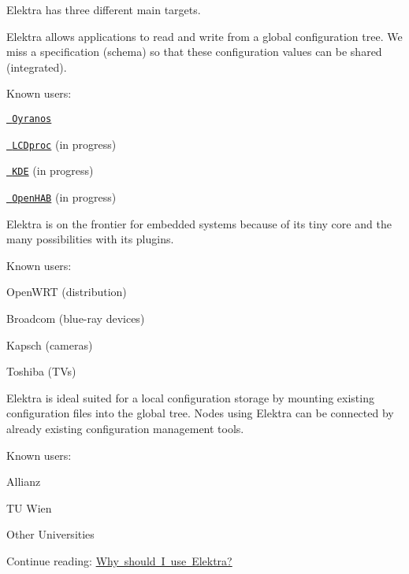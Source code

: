 Elektra has three different main targets.

Elektra allows applications to read and write from a global configuration tree. We miss a specification (schema) so that these configuration values can be shared (integrated).

Known users\+:


\begin{DoxyItemize}
\item \href{https://oyranos.org}{\texttt{ Oyranos}}
\item \href{http://lcdproc.omnipotent.net/}{\texttt{ L\+C\+Dproc}} (in progress)
\item \href{https://kde.org}{\texttt{ K\+DE}} (in progress)
\item \href{https://www.openhab.org/}{\texttt{ Open\+H\+AB}} (in progress)
\end{DoxyItemize}

Elektra is on the frontier for embedded systems because of its tiny core and the many possibilities with its plugins.

Known users\+:


\begin{DoxyItemize}
\item Open\+W\+RT (distribution)
\item Broadcom (blue-\/ray devices)
\item Kapsch (cameras)
\item Toshiba (T\+Vs)
\end{DoxyItemize}

Elektra is ideal suited for a local configuration storage by mounting existing configuration files into the global tree. Nodes using Elektra can be connected by already existing configuration management tools.

Known users\+:


\begin{DoxyItemize}
\item Allianz
\item TU Wien
\item Other Universities
\end{DoxyItemize}


\begin{DoxyItemize}
\item Continue reading\+: \mbox{\hyperlink{doc_WHY_md}{Why should I use Elektra?}} 
\end{DoxyItemize}